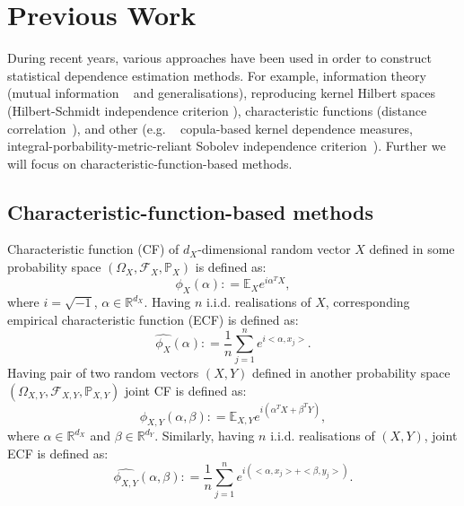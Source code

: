 \documentclass{article}
\begin{document}
\section{Previous Work}
\label{section:previous_work}
During recent years, various approaches have been used in order to construct statistical dependence estimation methods. For example, information theory (mutual information ~\cite{Cover2006} and generalisations), reproducing kernel Hilbert spaces (Hilbert-Schmidt independence criterion \cite{Gretton2005MeasuringSD}), characteristic functions (distance correlation~\cite{Feuerverger, Szekely}), and other (e.g. ~\cite{Pczos2012CopulabasedKD} copula-based kernel dependence measures, integral-porbability-metric-reliant Sobolev independence criterion~\cite{NIPS2019_9147}).
Further we will focus on characteristic-function-based methods. 

\subsection{Characteristic-function-based methods}
\label{section:previous_work_cf}
Characteristic function (CF) of $d_{X}$-dimensional random vector $X$ defined in some probability space $(\Omega_{X}, \mathcal{F}_{X}, \mathbb{P}_{X})$ is defined as: 
\begin{equation}
\label{eq:characteristic_function}
\phi_{X}(\alpha): = \mathbb{E}_{X} e^{i\alpha^{T}X}, 
\end{equation}
where $i=\sqrt{-1}$, $\alpha \in \mathbb{R}^{d_{X}}$. Having $n$ i.i.d. realisations of $X$, corresponding empirical characteristic function (ECF) is defined as:
\begin{equation}
\label{eq:ecf}
\widehat{\phi_{X}}(\alpha): = \frac{1}{n} \sum_{j=1}^{n} e^{i <\alpha, x_{j}>}.
\end{equation}
Having pair of two random vectors $(X,Y)$ defined in another probability space $(\Omega_{X,Y}, \mathcal{F}_{X,Y}, \mathbb{P}_{X,Y})$  joint CF is defined as:
\begin{equation}
\label{eq:joint_characteristic_function}
\phi_{X,Y}(\alpha,\beta): = \mathbb{E}_{X,Y} e^{i(\alpha^{T}X + \beta^{T}Y)},
\end{equation}
where $\alpha \in \mathbb{R}^{d_{X}}$ and $\beta \in \mathbb{R}^{d_{Y}}$. Similarly, having 
$n$ i.i.d. realisations of $(X,Y)$, joint ECF is defined as:
\begin{equation}
\label{eq:joint_ecf}
\widehat{\phi_{X,Y}}(\alpha,\beta): = \frac{1}{n} \sum_{j=1}^{n} e^{i(<\alpha, x_{j}> + <\beta, y_{j}>) }.
\end{equation}
\end{document}
